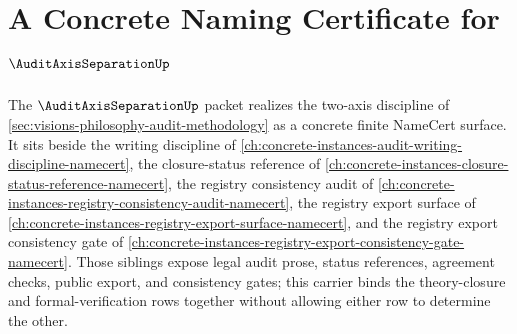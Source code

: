 \chapter{A Concrete Naming Certificate for $\AuditAxisSeparationUp$}
\label{ch:concrete-instances-audit-axis-separation-namecert}

The $\AuditAxisSeparationUp$ packet realizes the two-axis discipline of \autoref{sec:visions-philosophy-audit-methodology} as a concrete finite NameCert surface. It sits beside the writing discipline of \autoref{ch:concrete-instances-audit-writing-discipline-namecert}, the closure-status reference of \autoref{ch:concrete-instances-closure-status-reference-namecert}, the registry consistency audit of \autoref{ch:concrete-instances-registry-consistency-audit-namecert}, the registry export surface of \autoref{ch:concrete-instances-registry-export-surface-namecert}, and the registry export consistency gate of \autoref{ch:concrete-instances-registry-export-consistency-gate-namecert}. Those siblings expose legal audit prose, status references, agreement checks, public export, and consistency gates; this carrier binds the theory-closure and formal-verification rows together without allowing either row to determine the other.

